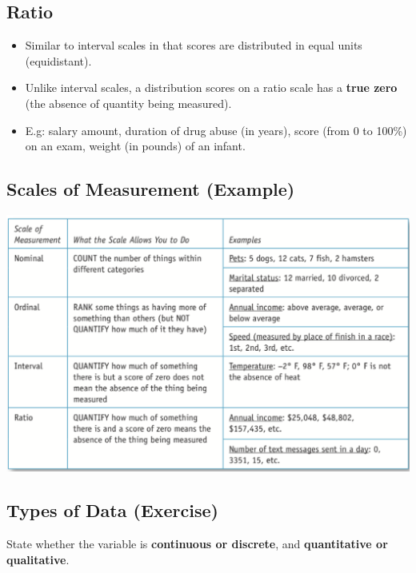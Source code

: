 \documentclass[]{article}
\providecommand{\tightlist}{%
  \setlength{\itemsep}{0pt}\setlength{\parskip}{0pt}}
\begin{document}
\hypertarget{ratio}{%
\subsection{Ratio}\label{ratio}}

\begin{itemize}
\tightlist
\item
  Similar to interval scales in that scores are distributed in equal
  units (equidistant).
\item
  Unlike interval scales, a distribution scores on a ratio scale has a
  {\textbf{true zero}} (the absence of quantity being measured).
\item
  E.g: salary amount, duration of drug abuse (in years), score (from 0
  to 100\%) on an exam, weight (in pounds) of an infant.
\end{itemize}

\hypertarget{scales-of-measurement-example}{%
\subsection{Scales of Measurement
(Example)}\label{scales-of-measurement-example}}

\includegraphics[width=0.8\linewidth]{figure/ExampleSOM}

\hypertarget{types-of-data-exercise}{%
\subsection{Types of Data (Exercise)}\label{types-of-data-exercise}}

State whether the variable is \textbf{continuous or discrete}, and
\textbf{quantitative or qualitative}.
\end{document}
